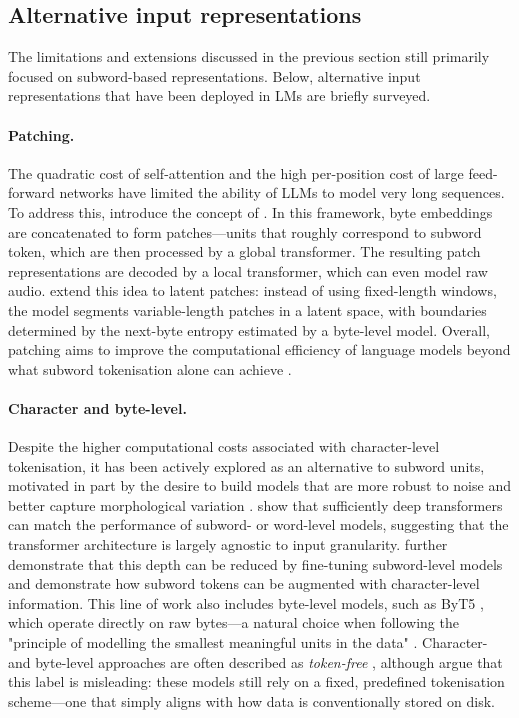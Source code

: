 \subsection{Alternative input representations}

The limitations and extensions discussed in the previous section still primarily focused on subword-based representations. Below, alternative input representations that have been deployed in LMs are briefly surveyed.

\paragraph{Patching.} The quadratic cost of self-attention and the high per-position cost of large feed-forward networks have limited the ability of LLMs to model very long sequences. To address this, \citet{yu2023megabyte} introduce the concept of . In this framework, byte embeddings are concatenated to form patches—units that roughly correspond to subword token, which are then processed by a global transformer. The resulting patch representations are decoded by a local transformer, which can even model raw audio. \citet{pagnoni2024byte} extend this idea to latent patches: instead of using fixed-length windows, the model segments variable-length patches in a latent space, with boundaries determined by the next-byte entropy estimated by a byte-level model. Overall, patching aims to improve the computational efficiency of language models beyond what subword tokenisation alone can achieve \citep{shao2025beyond}.

\paragraph{Character and byte-level.}
Despite the higher computational costs associated with character-level tokenisation, it has been actively explored as an alternative to subword units, motivated in part by the desire to build models that are more robust to noise and better capture morphological variation \citep{gupta2019character}. \citet{al-rfou_character-level_2019} show that sufficiently deep transformers can match the performance of subword- or word-level models, suggesting that the transformer architecture is largely agnostic to input granularity. \citet{libovicky-fraser-2020-towards} further demonstrate that this depth can be reduced by fine-tuning subword-level models and \citet{pinter2021learning} demonstrate how subword tokens can be augmented with character-level information.
This line of work also includes byte-level models, such as ByT5 \citep{xue-2022-byt5}, which operate directly on raw bytes—a natural choice when following the "principle of modelling the smallest meaningful units in the data" \citep{graves2013generating}. Character- and byte-level approaches are often described as \emph{token-free} \citep{clark-etal-2022-canine, xue-2022-byt5}, although \citet{mielke2021between} argue that this label is misleading: these models still rely on a fixed, predefined tokenisation scheme—one that simply aligns with how data is conventionally stored on disk.

